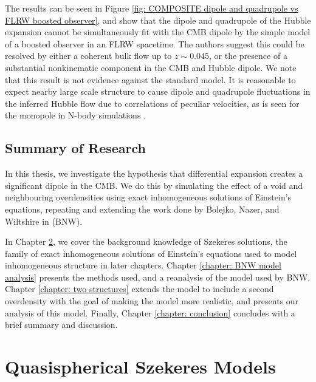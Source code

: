 \documentclass[a4paper,12pt]{report}
\begin{document}
 The results can be seen in Figure \ref{fig: COMPOSITE dipole and quadrupole vs FLRW boosted observer}, and show that the dipole and quadrupole of the Hubble expansion cannot be simultaneously fit with the CMB dipole by the simple model of a boosted observer in an FLRW spacetime. The authors suggest this could be resolved by either a coherent bulk flow up to $z \sim 0.045$, or the presence of a substantial nonkinematic component in the CMB and Hubble dipole. We note that this result is not evidence against the standard model. It is reasonable to expect nearby large scale structure to cause dipole and quadrupole fluctuations in the inferred Hubble flow due to correlations of peculiar velocities, as is seen for the monopole in N-body simulations \cite{RN122}.



\section{Summary of Research}
In this thesis, we investigate the hypothesis that differential expansion creates a significant dipole in the CMB. We do this by simulating the effect of a void and neighbouring overdensities using exact inhomogeneous solutions of Einstein's equations, repeating and extending the work done by Bolejko, Nazer, and Wiltshire in \cite{RN3} (BNW).

In Chapter \ref{chapter: Szekeres Solutions}, we cover the background knowledge of Szekeres solutions, the family of exact inhomogeneous solutions of Einstein's equations used to model inhomogeneous structure in later chapters. Chapter \ref{chapter: BNW model analysis} presents the methods used, and a reanalysis of the model used by BNW. Chapter \ref{chapter: two structures} extends the model to include a second overdensity with the goal of making the model more realistic, and presents our analysis of this model. Finally, Chapter \ref{chapter: conclusion} concludes with a brief summary and discussion.


\chapter{Quasispherical Szekeres Models} \label{chapter: Szekeres Solutions}
\end{document}
